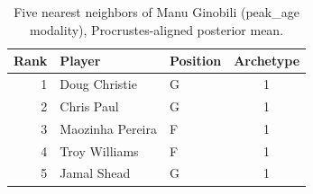 \begin{table}[htbp]
  \centering\small
  \begin{tabular}{rllc}
    \toprule
    Rank & Player & Position & Archetype \\
    \midrule
    1 & Doug Christie & G & 1 \\
    2 & Chris Paul & G & 1 \\
    3 & Maozinha Pereira & F & 1 \\
    4 & Troy Williams & F & 1 \\
    5 & Jamal Shead & G & 1 \\
    \bottomrule
  \end{tabular}
  \caption{Five nearest neighbors of Manu Ginobili (peak_age modality), Procrustes-aligned posterior mean.}
  \label{tab:Manu_Ginobili_neighbors_peak_age}
\end{table}

